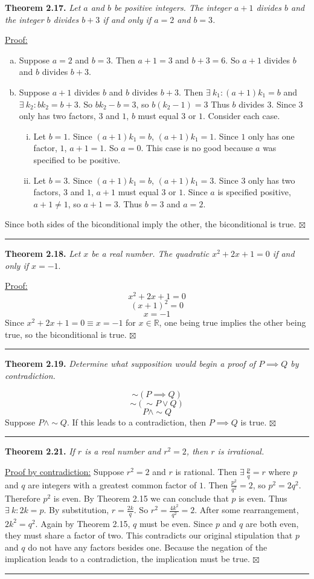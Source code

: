 \documentclass[a4paper,12pt]{article}
\newcommand{\entry}[3]
{
   \noindent\textbf{#1.}
   \emph{#2}
   \bigskip

   \noindent#3
   \bigskip
   \hrule
   \vspace{24pt}
}
\newcommand{\reals}{\mathbb{R}}
\newcommand{\sig}{$\boxtimes$}
\begin{document}
\entry{Theorem 2.17}
{Let $a$ and $b$ be positive integers. The integer $a + 1$ divides $b$ and the integer $b$ divides $b + 3$ if and only if $a = 2$ and $b = 3$.}
{
\underline{Proof:}
\begin{enumerate}[(a)]
\item
Suppose $a = 2$ and $b = 3$. Then $a + 1 = 3$ and $b + 3 = 6$. So $a + 1$ divides $b$ and $b$ divides $b + 3$.
\item
Suppose $a + 1$ divides $b$ and $b$ divides $b + 3$. Then $\exists~k_1 : (a + 1)k_1 = b$ and $\exists~k_2 : bk_2 = b + 3$. So $bk_2 - b = 3$, so $b(k_2 - 1) = 3$ Thus $b$ divides $3$. Since $3$ only has two factors, $3$ and $1$, $b$ must equal $3$ or $1$. Consider each case.
\begin{enumerate}[(i)]
\item
Let $b = 1$. Since $(a + 1)k_1 = b$, $(a + 1)k_1 = 1$. Since $1$ only has one factor, $1$, $a + 1 = 1$. So $a = 0$. This case is no good because $a$ was specified to be positive.
\item
Let $b = 3$. Since $(a + 1)k_1 = b$, $(a + 1)k_1 = 3$. Since $3$ only has two factors, $3$ and $1$, $a + 1$ must equal $3$ or $1$. Since $a$ is specified positive, $a + 1 \ne 1$, so $a + 1 = 3$. Thus $b = 3$ and $a = 2$.
\end{enumerate}
\end{enumerate}
Since both sides of the biconditional imply the other, the biconditional is true. \sig
}



\entry{Theorem 2.18}
{Let $x$ be a real number. The quadratic $x^2 + 2x + 1 = 0$ if and only if $x = -1.$}
{
\underline{Proof:} \[ x^2 + 2x + 1 = 0 \] \[ (x + 1)^2 = 0 \] \[ x = -1 \]
Since $x^2 + 2x + 1 = 0 \equiv x = -1$ for $ x \in \reals$, one being true implies the other being true, so the biconditional is true. \sig
}



\entry{Theorem 2.19}
{Determine what supposition would begin a proof of $P \implies Q$ by contradiction.}
{
\[ \sim(P \implies Q) \]
\[ \sim (\sim P \lor Q) \]
\[ P \land \sim Q \]
Suppose $P \land \sim Q$. If this leads to a contradiction, then $P \implies Q$ is true. \sig
}



\entry{Theorem 2.21}
{If $r$ is a real number and $r^2 = 2$, then $r$ is irrational.}
{
\underline{Proof by contradiction:} Suppose $r^2 = 2$ and $r$ is rational. Then $\exists~\frac{p}{q} = r$ where $p$ and $q$ are integers with a greatest common factor of $1$. Then $\frac{p^2}{q^2} = 2$, so $p^2 = 2q^2$. Therefore $p^2$ is even. By Theorem 2.15 we can conclude that $p$ is even. Thus $\exists~k : 2k = p$. By substitution, $r = \frac{2k}{q}$. So $r^2 = \frac{4k^2}{q^2} = 2$. After some rearrangement, $2k^2 = q^2$. Again by Theorem 2.15, $q$ must be even. Since $p$ and $q$ are both even, they must share a factor of two. This contradicts our original stipulation that $p$ and $q$ do not have any factors besides one. Because the negation of the implication leads to a contradiction, the implication must be true. \sig
}
\end{document}
